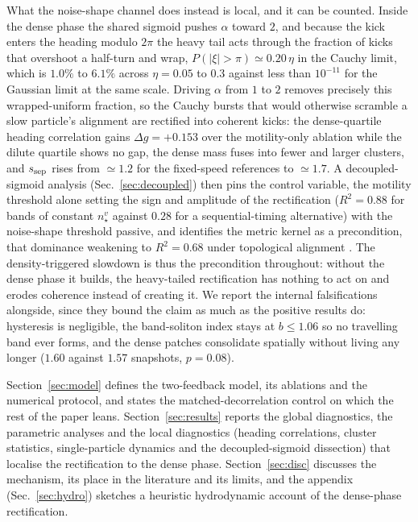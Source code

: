 \documentclass[11pt,a4paper]{article}
\begin{document}
What the noise-shape channel does instead is local, and it can be
counted. Inside the dense phase the shared sigmoid pushes
$\alpha$ toward $2$, and because the kick enters the heading
modulo $2\pi$ the heavy tail acts through the fraction of kicks
that overshoot a half-turn and wrap, $P(|\xi| > \pi) \simeq
0.20\,\eta$ in the Cauchy limit, which is $1.0\%$ to $6.1\%$
across $\eta = 0.05$ to $0.3$ against less than $10^{-11}$ for
the Gaussian limit at the same scale. Driving $\alpha$ from $1$
to $2$ removes precisely this wrapped-uniform fraction, so the
Cauchy bursts that would otherwise scramble a slow particle's
alignment are rectified into coherent kicks: the dense-quartile
heading correlation gains $\Delta g = +0.153$ over the
motility-only ablation while the dilute quartile shows no gap,
the dense mass fuses into fewer and larger clusters, and
$s_{\rm sep}$ rises from $\simeq 1.2$ for the fixed-speed
references to $\simeq 1.7$. A decoupled-sigmoid analysis
(Sec.~\ref{sec:decoupled}) then pins the control variable, the
motility threshold alone setting the sign and amplitude of the
rectification ($R^2 = 0.88$ for bands of constant
$n_\star^v$ against $0.28$ for a sequential-timing alternative)
with the noise-shape threshold passive, and identifies the metric
kernel as a precondition, that dominance weakening to
$R^2 = 0.68$ under topological alignment \citep{Ballerini2008,
Ginelli2010}. The density-triggered slowdown is thus the
precondition throughout: without the dense phase it builds, the
heavy-tailed rectification has nothing to act on and erodes
coherence instead of creating it. We report the internal
falsifications alongside, since they bound the claim as much as
the positive results do: hysteresis is negligible, the
band-soliton index stays at $b \le 1.06$ so no travelling band
ever forms, and the dense patches consolidate spatially without
living any longer ($1.60$ against $1.57$ snapshots, $p = 0.08$).

Section~\ref{sec:model} defines the two-feedback model, its
ablations and the numerical protocol, and states the
matched-decorrelation control on which the rest of the paper
leans. Section~\ref{sec:results} reports the global diagnostics,
the parametric analyses and the local diagnostics (heading
correlations, cluster statistics, single-particle dynamics and
the decoupled-sigmoid dissection) that localise the rectification
to the dense phase. Section~\ref{sec:disc} discusses the
mechanism, its place in the literature and its limits, and the
appendix (Sec.~\ref{sec:hydro}) sketches a heuristic
hydrodynamic account of the dense-phase rectification.
\end{document}
